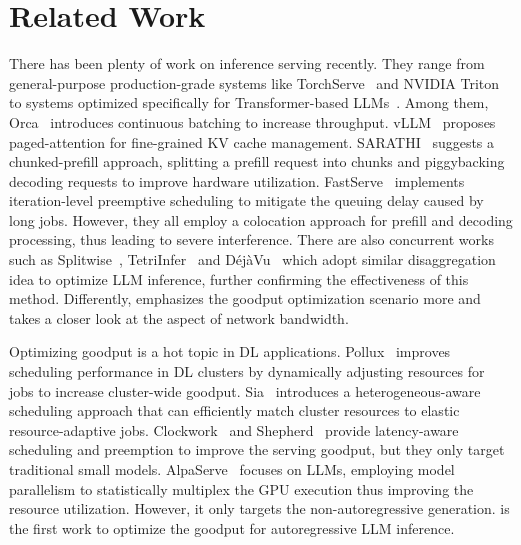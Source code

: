 \section{Related Work}
\label{sec:related}

 There has been plenty of work on inference serving recently. They range from general-purpose production-grade systems like TorchServe~\cite{torchserve} and NVIDIA Triton~\cite{nvidiatriton} to systems optimized specifically for Transformer-based LLMs~\cite{li2023alpaserve, yu2022orca, agrawal2023sarathi, wu2023fast, fang2021turbotransformers,fastertransformer,zhou2022pets,su2023hotgpt}. 
Among them, Orca~\cite{yu2022orca} introduces continuous batching to increase throughput. vLLM~\cite{vllm} proposes paged-attention for fine-grained KV cache management. SARATHI~\cite{agrawal2023sarathi} suggests a chunked-prefill approach, splitting a prefill request into chunks and piggybacking decoding requests to improve hardware utilization. FastServe~\cite{wu2023fast} implements iteration-level preemptive scheduling to mitigate the queuing delay caused by long jobs. However, they all employ a colocation approach for prefill and decoding processing, thus leading to severe interference. There are also concurrent works such as Splitwise~\cite{patel2023splitwise}, TetriInfer~\cite{hu2024inference} and DéjàVu~\cite{strati2024dejavu} which adopt similar disaggregation idea to optimize LLM inference, further confirming the effectiveness of this method. Differently, \sys emphasizes the goodput optimization scenario more and takes a closer look at the aspect of network bandwidth.


 Optimizing goodput is a hot topic in DL applications. Pollux~\cite{pollux} improves scheduling performance in DL clusters by dynamically adjusting resources for jobs to increase cluster-wide goodput. Sia~\cite{jayaram2023sia} introduces a heterogeneous-aware scheduling approach that can efficiently match cluster resources to elastic resource-adaptive jobs. Clockwork~\cite{clockwork} and Shepherd~\cite{zhangshepherd} provide latency-aware scheduling and preemption to improve the serving goodput, but they only target traditional small models. AlpaServe~\cite{li2023alpaserve} focuses on LLMs, employing model parallelism to statistically multiplex the GPU execution thus improving the resource utilization. However, it only targets the non-autoregressive generation. \sys is the first work to optimize the goodput for autoregressive LLM inference.


